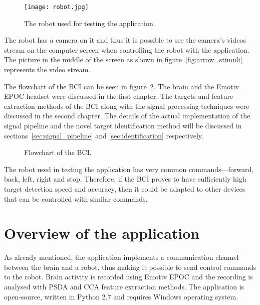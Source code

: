 \begin{figure}[h]
	\centering
	\texttt{[image: robot.jpg]}
	\caption{The robot used for testing the application.}
	\label{fig:robot}
\end{figure}

The robot has a camera on it and thus it is possible to see the camera's videos stream on the computer screen when controlling the robot with the application. The picture in the middle of the screen as shown in figure~\ref{fig:arrow_stimuli} represents the video stream.

The flowchart of the \gls{BCI} can be seen in figure~\ref{fig:whole_bci}. The brain and the Emotiv EPOC headset were discussed in the first chapter. The \glspl{target} and \gls{feature extraction} methods of the \gls{BCI} along with the signal processing techniques were discussed in the second chapter. The details of the actual implementation of the signal pipeline and the novel target identification method will be discussed in sections~\ref{sec:signal_pipeline} and \ref{sec:identification} respectively.

\begin{figure}[h!]
	\centering
	
	\caption{Flowchart of the BCI.}
	\label{fig:whole_bci}
\end{figure}

The robot used in testing the application has very common commands---forward, back, left, right and stop. Therefore, if the \gls{BCI} proves to have sufficiently high \gls{target} detection speed and accuracy, then it could be adapted to other devices that can be controlled with similar commands.

\section{Overview of the application}
\label{sec:application}

As already mentioned, the application implements a communication channel between the brain and a robot, thus making it possible to send control commands to the robot. Brain activity is recorded using Emotiv EPOC and the recording is analysed with \gls{PSDA} and \gls{CCA} \gls{feature extraction} methods. The application is open-source, written in Python 2.7 and requires Windows operating system.

